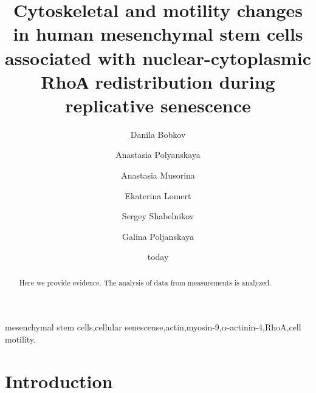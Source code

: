 \documentclass[english,authoryear]{elsarticle}
\title{Cytoskeletal and motility changes in human mesenchymal stem cells associated with nuclear-cytoplasmic RhoА redistribution during replicative senescence}
\begin{document}
\date{today}

\author[rvt]{Danila Bobkov}
\author[add]{Anastasia Polyanskaya}
\author[rvt]{Anastasia Musorina}
\author[rvt]{Ekaterina Lomert}
\author[rvt]{Sergey Shabelnikov}
\author[rvt]{Galina Poljanskaya}
\address[rvt]{Institute of Cytology of the Russian Academy of Science, 194064 Tikhoretsky ave. 4, St-Petersburg, Russia }
\address[add]{Centre for Study of Things}


\begin{abstract}
Here we provide evidence.
The analysis of data from measurements is analyzed.
\end{abstract}

\begin{keyword}
mesenchymal stem cells\sep cellular senescense\sep actin\sep myosin-9\sep $\alpha$-actinin-4\sep RhoA\sep cell motility.
\end{keyword}

\maketitle
\section{Introduction}
\end{document}
